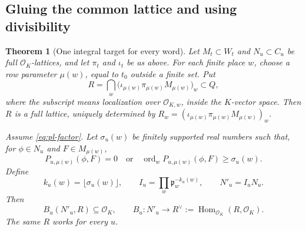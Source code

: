 \documentclass[11pt,a4paper]{article}
\numberwithin{equation}{section}
\newtheorem{theorem}{Theorem}[section]
\theoremstyle{remark}\newtheorem{remark}[theorem]{Remark}
\newcommand{\OK}{\mathcal O_K}
\begin{document}
\subsection{Gluing the common lattice and using divisibility}

\begin{theorem}[One integral target for every word]\label{thm:pl-integral}
Let $M_t\subset W_t$ and $N_u\subset C_u$ be full $\OK$-lattices, and let $\pi_t$ and $\iota_t$ be as above. For each finite place $w$, choose a row parameter $\mu(w)$, equal to $t_0$ outside a finite set. Put
\begin{equation}\label{eq:pl-R}
 R=\bigcap_w\bigl(\iota_{\mu(w)}\pi_{\mu(w)}M_{\mu(w)}\bigr)_w
       \subset Q,
\end{equation}
where the subscript means localization over $\mathcal O_{K,w}$, inside the $K$-vector space. Then $R$ is a full lattice, uniquely determined by
$R_w=(\iota_{\mu(w)}\pi_{\mu(w)}M_{\mu(w)})_w$.

Assume \eqref{eq:pl-factor}. Let $\sigma_u(w)$ be finitely supported real numbers such that, for $\phi\in N_u$ and $F\in M_{\mu(w)}$,
\begin{equation}\label{eq:pl-val}
 P_{u,\mu(w)}(\phi,F)=0
 \quad\text{or}\quad
 \operatorname{ord}_wP_{u,\mu(w)}(\phi,F)\ge\sigma_u(w).
\end{equation}
Define
\begin{equation}\label{eq:pl-shift}
 k_u(w)=\lfloor\sigma_u(w)\rfloor,\qquad
 I_u=\prod_w\mathfrak p_w^{-k_u(w)},\qquad N'_u=I_uN_u.
\end{equation}
Then
\begin{equation}\label{eq:pl-integral}
 B_u(N'_u,R)\subseteq\OK,\qquad
 B_u:N'_u\longrightarrow R^\vee:=\operatorname{Hom}_{\OK}(R,\OK).
\end{equation}
The same $R$ works for every $u$.
\end{theorem}
\end{document}
